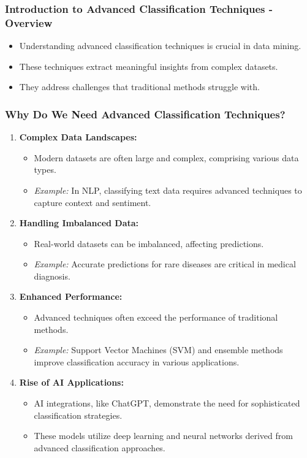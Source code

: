 \documentclass[aspectratio=169]{beamer}
\begin{document}
\frame{\titlepage}

\begin{frame}[fragile]
    \frametitle{Introduction to Advanced Classification Techniques - Overview}
    \begin{itemize}
        \item Understanding advanced classification techniques is crucial in data mining.
        \item These techniques extract meaningful insights from complex datasets.
        \item They address challenges that traditional methods struggle with.
    \end{itemize}
\end{frame}

\begin{frame}[fragile]
    \frametitle{Why Do We Need Advanced Classification Techniques?}
    \begin{enumerate}
        \item \textbf{Complex Data Landscapes:}
            \begin{itemize}
                \item Modern datasets are often large and complex, comprising various data types.
                \item \textit{Example:} In NLP, classifying text data requires advanced techniques to capture context and sentiment.
            \end{itemize}
        
        \item \textbf{Handling Imbalanced Data:}
            \begin{itemize}
                \item Real-world datasets can be imbalanced, affecting predictions.
                \item \textit{Example:} Accurate predictions for rare diseases are critical in medical diagnosis.
            \end{itemize}

        \item \textbf{Enhanced Performance:}
            \begin{itemize}
                \item Advanced techniques often exceed the performance of traditional methods.
                \item \textit{Example:} Support Vector Machines (SVM) and ensemble methods improve classification accuracy in various applications.
            \end{itemize}

        \item \textbf{Rise of AI Applications:}
            \begin{itemize}
                \item AI integrations, like ChatGPT, demonstrate the need for sophisticated classification strategies.
                \item These models utilize deep learning and neural networks derived from advanced classification approaches.
            \end{itemize}
    \end{enumerate}
\end{frame}
\end{document}
